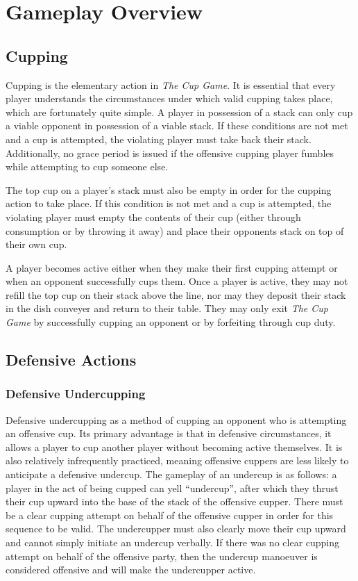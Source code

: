 \documentclass[12pt]{IEEEconf}
\begin{document}
\section{Gameplay Overview}
\label{section:gameplay}
\subsection{Cupping} Cupping is the elementary action in \textit{The Cup Game}. It is essential that every player understands the circumstances under which valid cupping takes place, which are fortunately quite simple. A player in possession of a stack can only cup a viable opponent in possession of a viable stack. If these conditions are not met and a cup is attempted, the violating player must take back their stack. Additionally, no grace period is issued if the offensive cupping player fumbles while attempting to cup someone else.

The top cup on a player's stack must also be empty in order for the cupping action to take place. If this condition is not met and a cup is attempted, the violating player must empty the contents of their cup (either through consumption or by throwing it away) and place their opponents stack on top of their own cup.

A player becomes active either when they make their first cupping attempt or when an opponent successfully cups them. Once a player is active, they may not refill the top cup on their stack above the line, nor may they deposit their stack in the dish conveyer and return to their table. They may only exit \textit{The Cup Game} by successfully cupping an opponent or by forfeiting through cup duty.
\subsection{Defensive Actions}
\subsubsection{Defensive Undercupping}
\label{section:defensive_undercupping} 
Defensive undercupping as a method of cupping an opponent who is attempting an offensive cup. Its primary advantage is that in defensive circumstances, it allows a player to cup another player without becoming active themselves. It is also relatively infrequently practiced, meaning offensive cuppers are less likely to anticipate a defensive undercup. The gameplay of an undercup is as follows: a player in the act of being cupped can yell ``undercup'', after which they thrust their cup upward into the base of the stack of the offensive cupper. There must be a clear cupping attempt on behalf of the offensive cupper in order for this sequence to be valid. The undercupper must also clearly move their cup upward and cannot simply initiate an undercup verbally. If there was no clear cupping attempt on behalf of the offensive party, then the undercup manoeuver is considered offensive and will make the undercupper active.   
\end{document}

